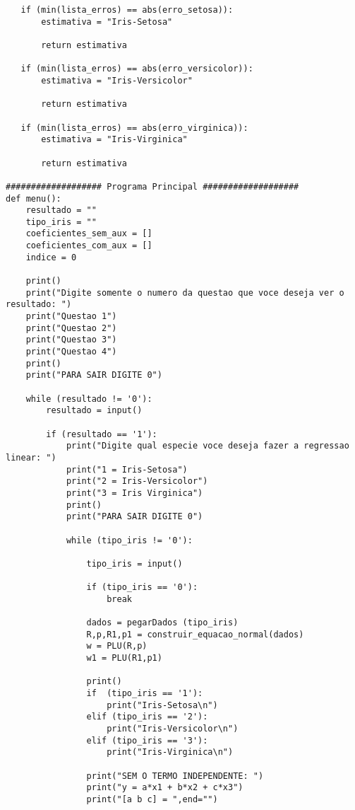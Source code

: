 \documentclass[a4paper,12pt,twoside]{article}
\begin{document}
\begin{lstlisting}
   if (min(lista_erros) == abs(erro_setosa)):
       estimativa = "Iris-Setosa"
       
       return estimativa
   
   if (min(lista_erros) == abs(erro_versicolor)):
       estimativa = "Iris-Versicolor"
       
       return estimativa
   
   if (min(lista_erros) == abs(erro_virginica)):
       estimativa = "Iris-Virginica"
       
       return estimativa
    
################### Programa Principal ###################
def menu():
    resultado = ""
    tipo_iris = ""
    coeficientes_sem_aux = []
    coeficientes_com_aux = []
    indice = 0
    
    print()
    print("Digite somente o numero da questao que voce deseja ver o resultado: ")
    print("Questao 1")
    print("Questao 2")
    print("Questao 3")
    print("Questao 4")
    print()
    print("PARA SAIR DIGITE 0")
    
    while (resultado != '0'):
        resultado = input()
    
        if (resultado == '1'):
            print("Digite qual especie voce deseja fazer a regressao linear: ")
            print("1 = Iris-Setosa")
            print("2 = Iris-Versicolor")
            print("3 = Iris Virginica")
            print()
            print("PARA SAIR DIGITE 0")
            
            while (tipo_iris != '0'):
             
                tipo_iris = input()
                
                if (tipo_iris == '0'):
                    break
           
                dados = pegarDados (tipo_iris)
                R,p,R1,p1 = construir_equacao_normal(dados)
                w = PLU(R,p)
                w1 = PLU(R1,p1)
                          
                print()
                if  (tipo_iris == '1'):
                    print("Iris-Setosa\n")
                elif (tipo_iris == '2'):
                    print("Iris-Versicolor\n")
                elif (tipo_iris == '3'):
                    print("Iris-Virginica\n")
                    
                print("SEM O TERMO INDEPENDENTE: ")
                print("y = a*x1 + b*x2 + c*x3")
                print("[a b c] = ",end="")
                

\end{lstlisting}
\end{document}
